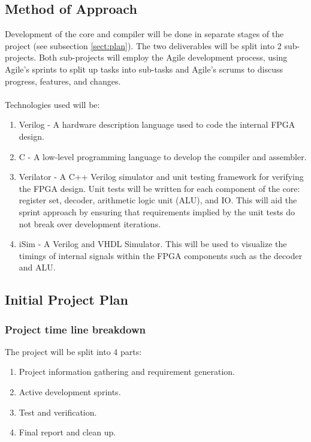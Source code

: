 \subsection*{Method of Approach}
Development of the core and compiler will be done in separate stages of the project (see subsection \ref{sect:plan}). The two deliverables will be split into 2 sub-projects. Both sub-projects will employ the Agile development process, using Agile's sprints to split up tasks into sub-tasks and Agile's scrums to discuss progress, features, and changes.
\\\\
Technologies used will be:
\begin{enumerate}
\item{Verilog - A hardware description language used to code the internal FPGA design.}

\item{C - A low-level programming language to develop the compiler and assembler.}

\item{Verilator - A C++ Verilog simulator and unit testing framework for verifying the FPGA design. Unit tests will be written for each component of the core: register set, decoder, arithmetic logic unit (ALU), and IO. This will aid the sprint approach by ensuring that requirements implied by the unit tests do not break over development iterations.}

\item{iSim - A Verilog and VHDL Simulator. This will be used to visualize the timings of internal signals within the FPGA components such as the decoder and ALU.}
\end{enumerate}

\newpage
\subsection*{Initial Project Plan}\label{sect:plan}

\subsubsection*{Project time line breakdown}
The project will be split into 4 parts: 

\begin{enumerate}
\item{Project information gathering and requirement generation.}
\item{Active development sprints.}
\item{Test and verification.}
\item{Final report and clean up.}
\end{enumerate}

